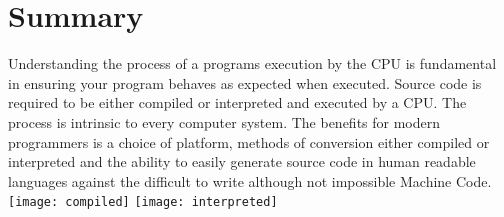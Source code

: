 \documentclass[a4paper]{article}
\begin{document}
\section*{Summary}
Understanding the process of a programs execution by the CPU is fundamental in ensuring your program behaves as expected when executed. Source code is required to be either compiled or interpreted and executed by a CPU. The process is intrinsic to every computer system. The benefits for modern programmers is a choice of platform, methods of conversion either compiled or interpreted and the ability to easily generate source code in human readable languages against the difficult to write although not impossible Machine Code.
\newline
\texttt{[image: compiled]}
\newline
\texttt{[image: interpreted]}



\end{document}
